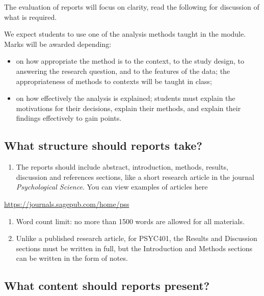 \documentclass[
  letterpaper,
  DIV=11,
  numbers=noendperiod]{scrreprt}
\providecommand{\tightlist}{%
  \setlength{\itemsep}{0pt}\setlength{\parskip}{0pt}}\usepackage{longtable,booktabs,array}
\begin{document}
The evaluation of reports will focus on clarity, read the following for
discussion of what is required.

We expect students to use one of the analysis methods taught in the
module. Marks will be awarded depending:

\begin{itemize}
\item
  on how appropriate the method is to the context, to the study design,
  to answering the research question, and to the features of the data;
  the appropriateness of methods to contexts will be taught in class;
\item
  on how effectively the analysis is explained; students must explain
  the motivations for their decisions, explain their methods, and
  explain their findings effectively to gain points.
\end{itemize}

\hypertarget{sec-what-structure}{%
\subsection{What structure should reports
take?}\label{sec-what-structure}}

\begin{enumerate}
\def\labelenumi{\arabic{enumi}.}
\tightlist
\item
  The reports should include abstract, introduction, methods, results,
  discussion and references sections, like a short research article in
  the journal \emph{Psychological Science}. You can view examples of
  articles here
\end{enumerate}

\url{https://journals.sagepub.com/home/pss}

\begin{enumerate}
\def\labelenumi{\arabic{enumi}.}
\setcounter{enumi}{1}
\item
  Word count limit: no more than 1500 words are allowed for all
  materials.
\item
  Unlike a published research article, for PSYC401, the Results and
  Discussion sections must be written in full, but the Introduction and
  Methods sections can be written in the form of notes.
\end{enumerate}

\hypertarget{sec-what-content}{%
\subsection{What content should reports
present?}\label{sec-what-content}}
\end{document}
